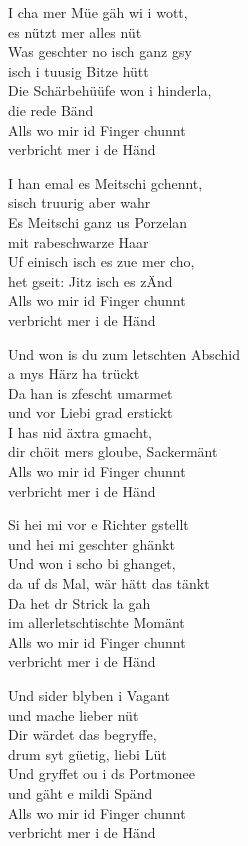 \documentclass[
  letterpaper,
  a5paper]{memoir}
\begin{document}
I cha mer Müe gäh wi i wott,\\
es nützt mer alles nüt\\
Was geschter no isch ganz gsy\\
isch i tuusig Bitze hütt\\
Die Schärbehüüfe won i hinderla,\\
die rede Bänd\\
Alls wo mir id Finger chunnt\\
verbricht mer i de Händ

I han emal es Meitschi gchennt,\\
s\textquotesingle isch truurig aber wahr\\
Es Meitschi ganz us Porzelan\\
mit rabeschwarze Haar\\
Uf einisch isch es zue mer cho,\\
het gseit: Jitz isch es z\textquotesingle Änd\\
Alls wo mir id Finger chunnt\\
verbricht mer i de Händ

Und won i\textquotesingle s du zum letschten Abschid\\
a mys Härz ha trückt\\
Da han i\textquotesingle s z\textquotesingle fescht umarmet\\
und vor Liebi grad erstickt\\
I has nid äxtra gmacht,\\
dir chöit mers gloube, Sackermänt\\
Alls wo mir id Finger chunnt\\
verbricht mer i de Händ

Si hei mi vor e Richter gstellt\\
und hei mi geschter ghänkt\\
Und won i scho bi ghanget,\\
da uf ds Mal, wär hätt das tänkt\\
Da het dr Strick la gah\\
im allerletschtischte Momänt\\
Alls wo mir id Finger chunnt\\
verbricht mer i de Händ

Und sider blyben i Vagant\\
und mache lieber nüt\\
Dir wärdet das begryffe,\\
drum syt güetig, liebi Lüt\\
Und gryffet ou i ds Portmonee\\
und gäht e mildi Spänd\\
Alls wo mir id Finger chunnt\\
verbricht mer i de Händ
\end{document}
